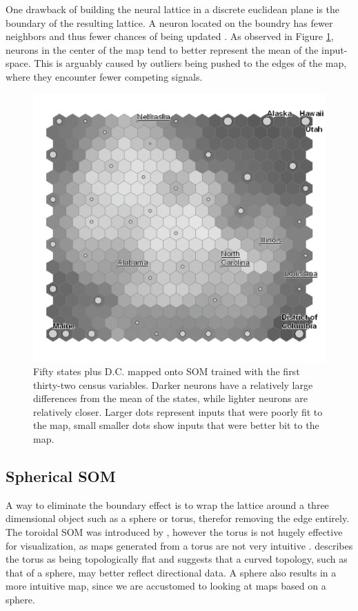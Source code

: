 \documentclass[11pt]{article}
\begin{document}
One drawback of building the neural lattice in a discrete euclidean plane is the
boundary of the resulting lattice.  A neuron located on the boundry has fewer
neighbors and thus fewer chances of being updated \citep{wu2006}.  As observed
in Figure \ref{figure1}, neurons in the center of the map tend to better
represent the mean of the input-space.  This is arguably caused by outliers
being pushed to the edges of the map, where they encounter fewer competing
signals.

\begin{figure}
\centering
\includegraphics[width=.6\linewidth]{gridedge_grey.pdf}
\caption{Fifty states plus D.C. mapped onto SOM trained with the first
thirty-two census variables.  Darker neurons have a relatively large differences
from the mean of the states, while lighter neurons are relatively closer.
Larger dots represent inputs that were poorly fit to the map, small smaller dots
show inputs that were better bit to the map.}
\label{figure1}
\end{figure}


\subsection{Spherical SOM}
A way to eliminate the boundary effect is to wrap the lattice around a three
dimensional object such as a sphere or torus, therefor removing the edge
entirely. The toroidal SOM was introduced by \cite{li1993}, however the torus is
not hugely effective for visualization, as maps generated from a torus are not
very intuitive \citep{ito2000,wu2006}.  \cite{ritter99} describes the torus as
being topologically flat and suggests that a curved topology, such as that of a
sphere, may better reflect directional data.  A sphere also results in a more
intuitive map, since we are accustomed to looking at maps based on a sphere.
\end{document}
